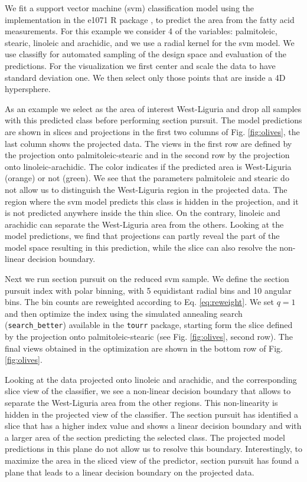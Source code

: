\documentclass[]{interact}
\theoremstyle{plain}%
\theoremstyle{definition}
\theoremstyle{remark}
\begin{document}
We fit a support vector machine (svm) classification model using the
implementation in the e1071 R package \citep{e1071}, to predict the area
from the fatty acid measurements. For this example we consider 4 of the
variables: palmitoleic, stearic, linoleic and arachidic, and we use a
radial kernel for the svm model. We use classifly for automated sampling
of the design space and evaluation of the predictions. For the
visualization we first center and scale the data to have standard
deviation one. We then select only those points that are inside a 4D
hypersphere.

As an example we select as the area of interest West-Liguria and drop
all samples with this predicted class before performing section pursuit.
The model predictions are shown in slices and projections in the first
two columns of Fig. \ref{fig:olives}, the last column shows the
projected data. The views in the first row are defined by the projection
onto palmitoleic-stearic and in the second row by the projection onto
linoleic-arachidic. The color indicates if the predicted area is
West-Liguria (orange) or not (green). We see that the parameters
palmitoleic and stearic do not allow us to distinguish the West-Liguria
region in the projected data. The region where the svm model predicts
this class is hidden in the projection, and it is not predicted anywhere
inside the thin slice. On the contrary, linoleic and arachidic can
separate the West-Liguria area from the others. Looking at the model
predictions, we find that projections can partly reveal the part of the
model space resulting in this prediction, while the slice can also
resolve the non-linear decision boundary.

Next we run section pursuit on the reduced svm sample. We define the
section pursuit index with polar binning, with 5 equidistant radial bins
and 10 angular bins. The bin counts are reweighted according to Eq.
\ref{eq:reweight}. We set \(q=1\) and then optimize the index using the
simulated annealing search (\texttt{search\_better}) available in the
\texttt{tourr} package, starting form the slice defined by the
projection onto palmitoleic-stearic (see Fig. \ref{fig:olives}, second
row). The final views obtained in the optimization are shown in the
bottom row of Fig. \ref{fig:olives}.

Looking at the data projected onto linoleic and arachidic, and the
corresponding slice view of the classifier, we see a non-linear decision
boundary that allows to separate the West-Liguria area from the other
regions. This non-linearity is hidden in the projected view of the
classifier. The section pursuit has identified a slice that has a higher
index value and shows a linear decision boundary and with a larger area
of the section predicting the selected class. The projected model
predictions in this plane do not allow us to resolve this boundary.
Interestingly, to maximize the area in the sliced view of the predictor,
section pursuit has found a plane that leads to a linear decision
boundary on the projected data.
\end{document}
